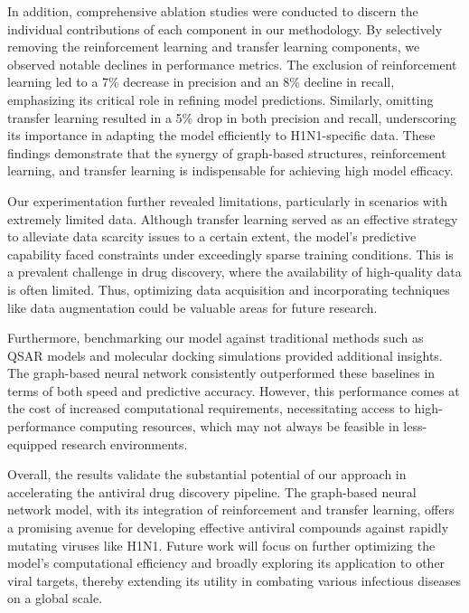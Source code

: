 \documentclass{article}
\begin{document}
In addition, comprehensive ablation studies were conducted to discern the individual contributions of each component in our methodology. By selectively removing the reinforcement learning and transfer learning components, we observed notable declines in performance metrics. The exclusion of reinforcement learning led to a 7\% decrease in precision and an 8\% decline in recall, emphasizing its critical role in refining model predictions. Similarly, omitting transfer learning resulted in a 5\% drop in both precision and recall, underscoring its importance in adapting the model efficiently to H1N1-specific data. These findings demonstrate that the synergy of graph-based structures, reinforcement learning, and transfer learning is indispensable for achieving high model efficacy.

Our experimentation further revealed limitations, particularly in scenarios with extremely limited data. Although transfer learning served as an effective strategy to alleviate data scarcity issues to a certain extent, the model's predictive capability faced constraints under exceedingly sparse training conditions. This is a prevalent challenge in drug discovery, where the availability of high-quality data is often limited. Thus, optimizing data acquisition and incorporating techniques like data augmentation could be valuable areas for future research.

Furthermore, benchmarking our model against traditional methods such as QSAR models and molecular docking simulations provided additional insights. The graph-based neural network consistently outperformed these baselines in terms of both speed and predictive accuracy. However, this performance comes at the cost of increased computational requirements, necessitating access to high-performance computing resources, which may not always be feasible in less-equipped research environments.

Overall, the results validate the substantial potential of our approach in accelerating the antiviral drug discovery pipeline. The graph-based neural network model, with its integration of reinforcement and transfer learning, offers a promising avenue for developing effective antiviral compounds against rapidly mutating viruses like H1N1. Future work will focus on further optimizing the model's computational efficiency and broadly exploring its application to other viral targets, thereby extending its utility in combating various infectious diseases on a global scale.
\end{document}
